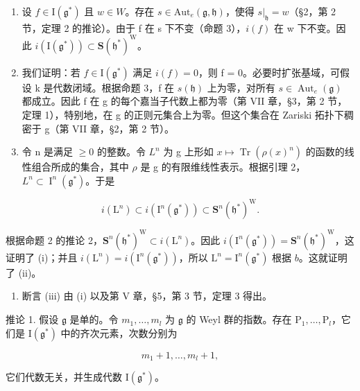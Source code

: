 \begin{enumerate}
\def\labelenumi{\alph{enumi})}
\item
  设 \(f \in \mathrm{I}(\mathfrak{g}^{*})\) 且 \(w \in W\)。存在 \(s \in \mathrm{Aut}_{e}(\mathfrak{g}, \mathfrak{h})\)，使得 \(s|_{\mathfrak{h}} = w\)（§2，第 2 节，定理 2 的推论）。由于 f 在 s 下不变（命题 3），\(i(f)\) 在 w 下不变。因此 \(i(\mathrm{I}(\mathfrak{g}^{*})) \subset \mathbf{S}(\mathfrak{h}^{*})^{\mathrm{W}}\)。
\item
  我们证明：若 \(f \in \mathrm{I}(\mathfrak{g}^{*})\) 满足 \(i(f) = 0\)，则 f = 0。必要时扩张基域，可假设 k 是代数闭域。根据命题 3，f 在 \(s(\mathfrak{h})\) 上为零，对所有 \(s \in \operatorname{Aut}_{e}(\mathfrak{g})\) 都成立。因此 f 在 g 的每个嘉当子代数上都为零（第 VII 章，§3，第 2 节，定理 1），特别地，在 g 的正则元集合上为零。但这个集合在 Zariski 拓扑下稠密于 g（第 VII 章，§2，第 2 节）。
\item
  令 n 是满足 \(\geq 0\) 的整数。令 \(L^{n}\) 为 g 上形如 \(x \mapsto \operatorname{Tr}(\rho(x)^{n})\) 的函数的线性组合所成的集合，其中 \(\rho\) 是 g 的有限维线性表示。根据引理 2，\(L^{n} \subset \operatorname{I}^{n}(\mathfrak{g}^{*})\)。于是
\end{enumerate}

\[
i \left(\mathrm{L} ^ {n}\right) \subset i \left(\mathrm{I} ^ {n} \left(\mathfrak {g} ^ {*}\right)\right) \subset \mathbf {S} ^ {n} \left(\mathfrak {h} ^ {*}\right) ^ {\mathrm{W}}.
\]

根据命题 2 的推论 2，\(\mathbf{S}^n (\mathfrak{h}^*)^{\mathrm{W}}\subset i(\mathrm{L}^n)\)。因此 \(i(\mathrm{I}^n (\mathfrak{g}^*)) = \mathbf{S}^n (\mathfrak{h}^*)^{\mathrm{W}}\)，这证明了 (i)；并且 \(i(\mathrm{L}^n) = i(\mathrm{I}^n (\mathfrak{g}^*))\)，所以 \(\mathrm{L}^n = \mathrm{I}^n (\mathfrak{g}^*)\) 根据 \(b\)。这就证明了 (ii)。

\begin{enumerate}
\def\labelenumi{\alph{enumi})}
\setcounter{enumi}{3}
\tightlist
\item
  断言 (iii) 由 (i) 以及第 V 章，§5，第 3 节，定理 3 得出。
\end{enumerate}

推论 1. 假设 \(\mathfrak{g}\) 是单的。令 \(m_1, \ldots, m_l\) 为 \(\mathfrak{g}\) 的 Weyl 群的指数。存在 \(\mathrm{P}_1, \ldots, \mathrm{P}_l\)，它们是 \(\mathrm{I}(\mathfrak{g}^*)\) 中的齐次元素，次数分别为

\[
m _ {1} + 1, \dots , m _ {l} + 1,
\]

它们代数无关，并生成代数 \(\mathrm{I}(\mathfrak{g}^*)\)。


